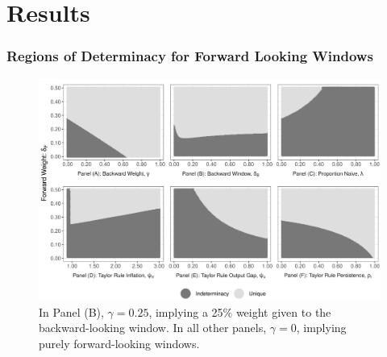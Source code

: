 \documentclass{beamer}
\begin{document}
\section*{Results}

\begin{frame}
	\frametitle{Regions of Determinacy for Forward Looking Windows}	
	\begin{center}		
		\begin{figure}%
			\includegraphics[width=\textwidth,height=0.7\textheight,keepaspectratio]{../paper/determinacy_notitle.png}
			\caption{{\tiny In Panel (B), $\gamma = 0.25$, implying a 25\% weight given to the backward-looking window. In all other panels, $\gamma =0$, implying purely forward-looking windows.}}
		\end{figure}%
	\end{center}%
\end{frame}
\end{document}
